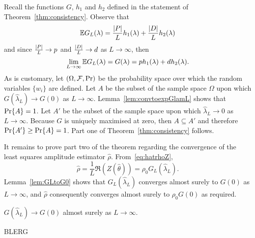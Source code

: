 \documentclass[journal]{IEEEtran}
\begin{document}
Recall the functions $G$, $h_1$ and $h_2$ defined in the statement of Theorem~\ref{thm:consistency}.  Observe that
\[
{\mathbb E} G_L(\lambda) = \frac{{\left\vert P \right\vert}}{L} h_1(\lambda) + \frac{{\left\vert D \right\vert}}{L} h_2(\lambda)
\]
and since $\frac{{\left\vert P \right\vert}}{L} \rightarrow p$ and $\frac{{\left\vert D \right\vert}}{L} \rightarrow d$ as $L \rightarrow \infty$, then
\[
\lim_{L \rightarrow\infty} {\mathbb E} G_L(\lambda) = G(\lambda) = p h_1(\lambda)   +  d h_2(\lambda).
\]
As is customary, let $(\Omega, \mathcal F, {\operatorname{Pr}})$ be the probability space over which the random variables $\{w_i\}$ are defined.  Let $A$ be the subset of the sample space $\Omega$ upon which $G(\hat{\lambda}_L) \rightarrow G(0)$ as $L\rightarrow\infty$.  Lemma~\ref{lem:convtoexpGlamL} shows that ${\operatorname{Pr}}\{A\} = 1$.  Let $A'$ be the subset of the sample space upon which $\hat{\lambda}_L \rightarrow 0$ as $L\rightarrow \infty$.  Because $G$ is uniquely maximised at zero, then $A \subseteq A'$ and therefore ${\operatorname{Pr}}\{A'\} \geq {\operatorname{Pr}}\{A\} = 1$.  Part one of Theorem~\ref{thm:consistency} follows.  

It remains to prove part two of the theorem regarding the convergence of the least squares amplitude estimator $\hat{\rho}$.  From~\eqref{eq:hatrhoZ},
\begin{equation}\label{eq:rhoGLZ}
\hat{\rho} = \frac{1}{L}\Re(Z(\hat{\theta})) = \rho_0 G_L(\hat{\lambda}_L).
\end{equation}  
Lemma~\ref{lem:GLtoG0} shows that $G_L(\hat{\lambda}_L)$ converges almost surely to $G(0)$ as $L\rightarrow\infty$, and $\hat{\rho}$ consequently converges almost surely to $\rho_0 G(0)$ as required.

\begin{lemma}\label{lem:convtoexpGlamL} 
$G(\hat{\lambda}_L) \rightarrow G(0)$ almost surely as $L \rightarrow \infty$.
\end{lemma}
\begin{IEEEproof}
BLERG
\end{IEEEproof}
\end{document}
